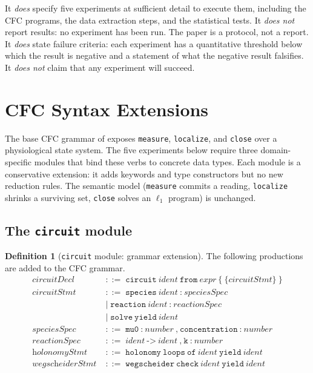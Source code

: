 \documentclass[11pt,a4paper]{article}
\theoremstyle{expthm}
\theoremstyle{definition}
\newtheorem{definition}[theorem]{Definition}
\theoremstyle{remark}
\newcommand{\cf}[1]{\texttt{#1}}
\begin{document}
It \emph{does} specify five experiments at sufficient detail to execute
them, including the CFC programs, the data extraction steps, and the
statistical tests. It \emph{does not} report results: no experiment has
been run. The paper is a protocol, not a report. It \emph{does} state
failure criteria: each experiment has a quantitative threshold below
which the result is negative and a statement of what the negative result
falsifies. It \emph{does not} claim that any experiment will succeed.

\section{CFC Syntax Extensions}
\label{sec:extensions}

The base CFC grammar of \citep{sachikonye2026cfc} exposes \cf{measure},
\cf{localize}, and \cf{close} over a physiological state system. The five
experiments below require three domain-specific modules that bind these
verbs to concrete data types. Each module is a conservative extension: it
adds keywords and type constructors but no new reduction rules. The
semantic model (\cf{measure} commits a reading, \cf{localize} shrinks a
surviving set, \cf{close} solves an $\ell_1$ program) is unchanged.

\subsection{The \texttt{circuit} module}
\label{sec:ext-circuit}

\begin{definition}[\cf{circuit} module: grammar extension]
\label{def:circuit-grammar}
The following productions are added to the CFC grammar.
\begin{align*}
\textit{circuitDecl} &\;::=\; \cf{circuit}\ \textit{ident}\
  \cf{from}\ \textit{expr}\ \cf{\{}\ \{\textit{circuitStmt}\}\ \cf{\}}\\[2pt]
\textit{circuitStmt} &\;::=\; \cf{species}\ \textit{ident}\
  \cf{:}\ \textit{speciesSpec}\\
  &\;\mid\; \cf{reaction}\ \textit{ident}\
  \cf{:}\ \textit{reactionSpec}\\
  &\;\mid\; \cf{solve}\ \cf{yield}\ \textit{ident}\\[2pt]
\textit{speciesSpec} &\;::=\; \cf{mu0}\ \cf{:}\ \textit{number}\
  \cf{,}\ \cf{concentration}\ \cf{:}\ \textit{number}\\[2pt]
\textit{reactionSpec} &\;::=\; \textit{ident}\ \cf{->}\ \textit{ident}\
  \cf{,}\ \cf{k}\ \cf{:}\ \textit{number}\\[2pt]
\textit{holonomyStmt} &\;::=\; \cf{holonomy}\ \cf{loops}\
  \cf{of}\ \textit{ident}\ \cf{yield}\ \textit{ident}\\[2pt]
\textit{wegscheiderStmt} &\;::=\; \cf{wegscheider}\ \cf{check}\
  \textit{ident}\ \cf{yield}\ \textit{ident}
\end{align*}
\end{definition}
\end{document}
